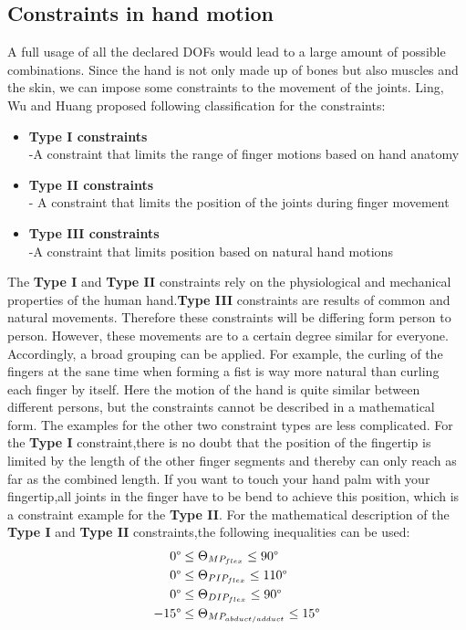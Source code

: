 \subsection{Constraints in hand motion}
A full usage of all the declared DOFs would lead to a large amount of possible combinations. Since the hand is not only made up of bones but also muscles and the skin, we can impose some constraints \cite{Badler.1987,Pavlovic.1997} to the movement of the joints. Ling, Wu and Huang  \cite{LIN.2000} proposed following classification for the constraints:
\begin{itemize}
\item \textbf{Type I constraints}\\
	-A constraint that limits the range of finger motions based on hand anatomy
	\item \textbf{Type II constraints}\\
	- A constraint that limits the position of the joints during finger movement
	\item \textbf{Type III constraints\\}
	-A constraint that limits position based on natural hand motions
\end{itemize} 
The \textbf{Type I} and \textbf{Type II} constraints rely on the physiological and mechanical properties of the human hand.\textbf{Type III} constraints are results of common and natural movements. Therefore these constraints will be differing form person to person. However, these movements are to a certain degree similar for everyone. Accordingly, a broad grouping can be applied. For example, the curling of the fingers at the sane time when forming a fist is way more natural than curling each finger by itself. Here the motion of the hand is quite similar between different persons, but the constraints cannot be described in a mathematical form. The examples for the other two constraint types are less complicated. For the \textbf{Type I} constraint,there is no doubt that the position of the fingertip is limited by the length of the other finger segments and thereby can only reach as far as the combined length. If you want to touch your hand palm with your fingertip,all joints in the finger have to be bend to achieve this position, which is a constraint example for the \textbf{Type II}. For the mathematical description of the \textbf{Type I} and \textbf{Type II} constraints,the following inequalities can be used:\\
\begin{equation}
\begin{split}
0\degree&\leq \Theta _{MP_{flex}} \leq 90\degree\\
0\degree&\leq \Theta _{PIP_{flex}} \leq 110\degree\\
0\degree&\leq \Theta _{DIP_{flex}} \leq 90\degree\\
-15\degree&\leq \Theta _{MP_{abduct/adduct}} \leq 15\degree
\end{split}
\end{equation}
